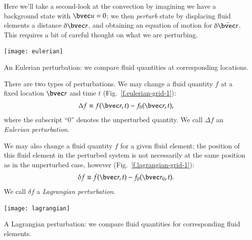 Here we'll take a second-look at the convection by imagining we have a background state with $\vu=0$; we then \emph{perturb} state by displacing fluid elements a distance $\delta\vr$, and obtaining an equation of motion for $\delta\ddot{\vr}$.  This requires a bit of careful thought on what we are perturbing.

\begin{marginfigure}[18\baselineskip]
\texttt{[image: eulerian]}
\caption{\label{f.eulerian-grid-1} An Eulerian perturbation: we compare fluid quantities at corresponding locations.}
\end{marginfigure}
There are two types of perturbations. We may change a fluid quantity $f$ at a fixed location $\vr$ and time $t$ (Fig.~\ref{f.eulerian-grid-1}):
\begin{equation}\label{e.eulerian-perturbation}
  \Delta f \equiv f(\vr,t)-f_{0}(\vr,t),
\end{equation}
where the subscript ``0'' denotes the unperturbed quantity.  We call $\Delta f$ an \emph{Eulerian perturbation}.  

We may also change a fluid quantity $f$ for a given fluid element; the position of this fluid element in the perturbed system is not necessarily at the same position as in the unperturbed case, however (Fig.~\ref{f.lagrangian-grid-1}):
\begin{equation}\label{e.lagrangian-perturbation}
 \delta f \equiv f(\vr,t) - f_{0}(\vr_{0},t).
\end{equation}
We call $\delta f$ a \emph{Lagrangian perturbation}. 
\begin{marginfigure}[280pt]
\texttt{[image: lagrangian]}
\caption{\label{f.lagrangian-grid-1} A Lagrangian perturbation: we compare fluid quantities for corresponding fluid elements.}
\end{marginfigure}

